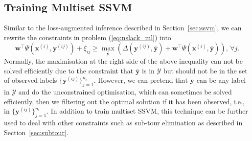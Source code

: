 \subsection{Training Multiset SSVM}
\label{sec:train-ssvm-ms}

Similar to the loss-augmented inference described in Section~\ref{sec:ssvm}, 
we can rewrite the constraints in problem (\ref{eq:nslack_ml}) into
\begin{equation*}
\mathbf{w}^\top \Psi(\mathbf{x}^{(i)}, \mathbf{y}^{(ij)}) + \xi_{ij} \ge 
\max_{\bar{\mathbf{y}}} \left( \Delta(\mathbf{y}^{(ij)}, \bar{\mathbf{y}}) + \mathbf{w}^\top \Psi(\mathbf{x}^{(i)}, \bar{\mathbf{y}}) \right),
\, \forall j.
\end{equation*} 
Normally, the maximisation at the right side of the above inequality can not be solved efficiently due to the constraint that 
$\bar{\mathbf{y}}$ is in $\mathcal{Y}$ but should not be in the set of observed labels $\{\mathbf{y}^{(ij)}\}_{j=1}^{n_i}$.
However, we can pretend that $\bar{\mathbf{y}}$ can be any label in $\mathcal{Y}$ and do the unconstrained optimisation,
which can sometimes be solved efficiently, then we filtering out the optimal solution if it has been observed, 
i.e., in $\{\mathbf{y}^{(ij)}\}_{j=1}^{n_i}$. 
In addition to train multiset SSVM, this technique can be further used to deal with other constraints such as sub-tour elimination 
as described in Section~\ref{sec:subtour}.
